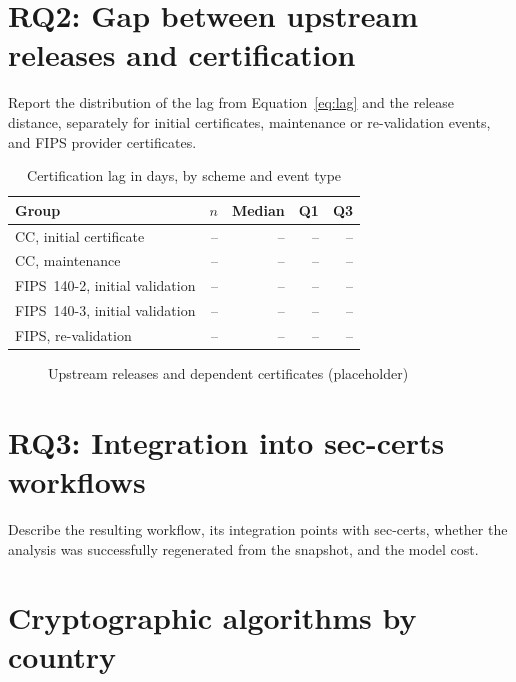 \section{RQ2: Gap between upstream releases and certification}
\label{sec:results-rq2}

{Report the distribution of the lag from Equation~\ref{eq:lag} and the release
distance, separately for initial certificates, maintenance or re-validation events,
and FIPS provider certificates.}

\begin{table}[htbp]
  \centering
  \caption{Certification lag in days, by scheme and event type}
  \label{tab:lag}
  \begin{tabular}{lrrrr}
    \toprule
    Group & $n$ & Median & Q1 & Q3 \\
    \midrule
    CC, initial certificate & -- & -- & -- & -- \\
    CC, maintenance & -- & -- & -- & -- \\
    FIPS~140-2, initial validation & -- & -- & -- & -- \\
    FIPS~140-3, initial validation & -- & -- & -- & -- \\
    FIPS, re-validation & -- & -- & -- & -- \\
    \bottomrule
  \end{tabular}
\end{table}

\begin{figure}[htbp]
  \centering
  \caption{Upstream releases and dependent certificates (placeholder)}
  \label{fig:timeline}
\end{figure}

\section{RQ3: Integration into sec-certs workflows}
\label{sec:results-rq3}

{Describe the resulting workflow, its integration points with sec-certs,
whether the analysis was successfully regenerated from the snapshot, and the model
cost.}

\section{Cryptographic algorithms by country}
\label{sec:results-country}

